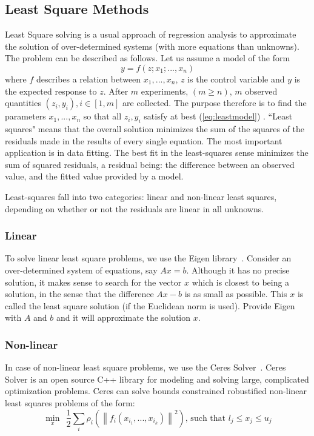 \subsection{Least Square Methods}
\label{subsc:least}
Least Square solving is a usual approach of regression analysis to approximate the solution of over-determined systems (with more equations than unknowns). The problem can be described as follows. Let us assume a model of the form
\begin{equation}
  y = f(z; x_1; ..., x_n)
  \label{eq:leastmodel}
\end{equation}
where $f$ describes a relation between $x_1, ..., x_n$, $z$ is the control variable and $y$ is the expected response to $z$. After $m$ experiments, $(m \geq n)$, $m$ observed quantities $(z_i, y_i), i \in [1, m]$ are collected. The purpose therefore is to find the parameters $x_1, ..., x_n$ so that all $z_i, y_i$ satisfy at best (\ref{eq:leastmodel}) . ``Least squares" means that the overall solution minimizes the sum of the squares of the residuals made in the results of every single equation.
The most important application is in data fitting. The best fit in the least-squares sense minimizes the sum of squared residuals, a residual being: the difference between an observed value, and the fitted value provided by a model.

Least-squares fall into two categories: linear and non-linear least squares, depending on whether or not the residuals are linear in all unknowns.

\subsubsection{Linear}
To solve linear least square problems, we use the Eigen library~\cite{eigenweb}. Consider an over-determined system of equations, say $Ax = b$. Although it has no precise solution, it makes sense to search for the vector $x$ which is closest to being a solution, in the sense that the difference $Ax - b$ is as small as possible. This $x$ is called the least square solution (if the Euclidean norm is used). Provide Eigen with $A$ and $b$ and it will approximate the solution $x$.

\subsubsection{Non-linear}
In case of non-linear least square problems, we use the Ceres Solver~\cite{ceres}. Ceres Solver is an open source C++ library for modeling and solving large, complicated optimization problems. Ceres can solve bounds constrained robustified non-linear least squares problems of the form:
\begin{equation*}
  \min_{x}\ \ \frac{1}{2} \sum_{i} \rho_i \left(\left\lVert f_i(x_{i_1}, ..., x_{i_k})  \right\rVert^2 \right) \text{, such that  } l_j \leq x_j \leq u_j
\end{equation*}

